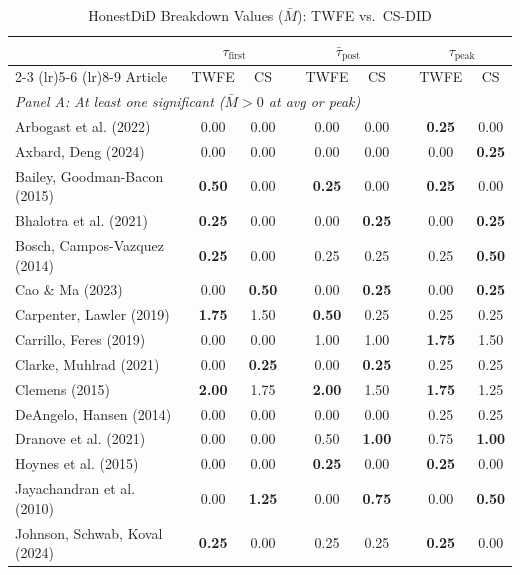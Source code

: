 \begin{table}[htbp]
\centering
\caption{HonestDiD Breakdown Values ($\bar{M}$): TWFE vs.\ CS-DID}
\label{tab:honestdid_v3}
\footnotesize
\begin{tabular}{@{}lcccccccc@{}}
\toprule
 & \multicolumn{2}{c}{$\tau_{\text{first}}$} & & \multicolumn{2}{c}{$\bar{\tau}_{\text{post}}$} & & \multicolumn{2}{c}{$\tau_{\text{peak}}$} \\
\cmidrule(lr){2-3} \cmidrule(lr){5-6} \cmidrule(lr){8-9}
Article & TWFE & CS & & TWFE & CS & & TWFE & CS \\
\midrule
\multicolumn{9}{l}{\textit{Panel A: At least one significant ($\bar{M}>0$ at avg or peak)}} \\
\addlinespace[3pt]
Arbogast et al. (2022) & 0.00 & 0.00 & & 0.00 & 0.00 & & \textbf{0.25} & 0.00 \\
Axbard, Deng (2024) & 0.00 & 0.00 & & 0.00 & 0.00 & & 0.00 & \textbf{0.25} \\
Bailey, Goodman-Bacon (2015) & \textbf{0.50} & 0.00 & & \textbf{0.25} & 0.00 & & \textbf{0.25} & 0.00 \\
Bhalotra et al. (2021) & \textbf{0.25} & 0.00 & & 0.00 & \textbf{0.25} & & 0.00 & \textbf{0.25} \\
Bosch, Campos-Vazquez (2014) & \textbf{0.25} & 0.00 & & 0.25 & 0.25 & & 0.25 & \textbf{0.50} \\
Cao \& Ma (2023) & 0.00 & \textbf{0.50} & & 0.00 & \textbf{0.25} & & 0.00 & \textbf{0.25} \\
Carpenter, Lawler (2019) & \textbf{1.75} & 1.50 & & \textbf{0.50} & 0.25 & & 0.25 & 0.25 \\
Carrillo, Feres (2019) & 0.00 & 0.00 & & 1.00 & 1.00 & & \textbf{1.75} & 1.50 \\
Clarke, Muhlrad (2021) & 0.00 & \textbf{0.25} & & 0.00 & \textbf{0.25} & & 0.25 & 0.25 \\
Clemens (2015) & \textbf{2.00} & 1.75 & & \textbf{2.00} & 1.50 & & \textbf{1.75} & 1.25 \\
DeAngelo, Hansen (2014) & 0.00 & 0.00 & & 0.00 & 0.00 & & 0.25 & 0.25 \\
Dranove et al. (2021) & 0.00 & 0.00 & & 0.50 & \textbf{1.00} & & 0.75 & \textbf{1.00} \\
Hoynes et al. (2015) & 0.00 & 0.00 & & \textbf{0.25} & 0.00 & & \textbf{0.25} & 0.00 \\
Jayachandran et al. (2010) & 0.00 & \textbf{1.25} & & 0.00 & \textbf{0.75} & & 0.00 & \textbf{0.50} \\
Johnson, Schwab, Koval (2024) & \textbf{0.25} & 0.00 & & 0.25 & 0.25 & & \textbf{0.25} & 0.00 \\

\end{tabular}
\end{table}
